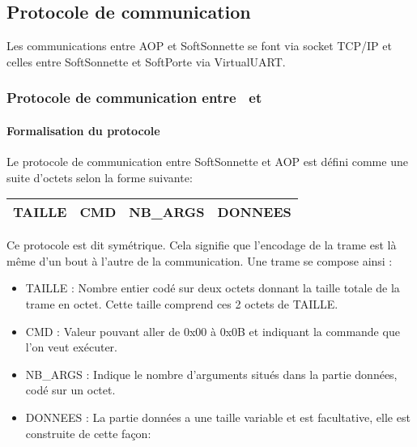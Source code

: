 \subsection{Protocole de communication}

Les communications entre AOP et SoftSonnette se font via socket TCP/IP et celles entre SoftSonnette et SoftPorte via VirtualUART. 

\subsubsection{Protocole de communication entre \appliLin~et \appliA}%

    \paragraph{Formalisation du protocole}%

    Le protocole de communication entre SoftSonnette et AOP est défini comme une suite d'octets selon la forme suivante:

    \begin{center}
        \begin{tabular}{|c|c|c|c|}
            \hline
            TAILLE & CMD & NB\_ARGS & DONNEES \\
            \hline
        \end{tabular}
    \end{center}

    Ce protocole est dit symétrique.
    Cela signifie que l'encodage de la trame est là même d'un bout à l'autre de la communication.
    Une trame se compose ainsi :
    
    \begin{itemize}
        \item {TAILLE : Nombre entier codé sur deux octets donnant la taille totale de la trame en octet.
        Cette taille comprend ces 2 octets de TAILLE.}
        \item {CMD : Valeur pouvant aller de 0x00 à 0x0B et indiquant la commande que l'on veut exécuter.}
        \item {NB\_ARGS : Indique le nombre d'arguments situés dans la partie données, codé sur un octet.}
        \item {DONNEES : La partie données a une taille variable et est facultative, elle est construite de cette façon:}
       
    \end{itemize} 

